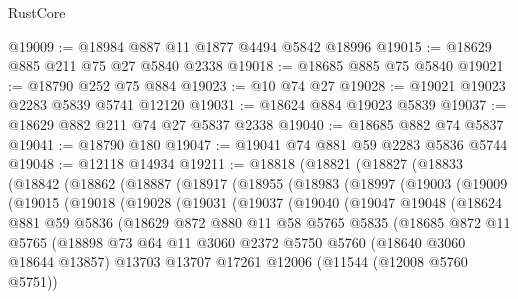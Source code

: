\begin{lexlean}{RustCore}
\begin{coremodule}
@19009 := @18984 @887 @11 @1877 @4494 @5842 @18996
@19015 := @18629 @885 @211 @75 @27 @5840 @2338
@19018 := @18685 @885 @75 @5840
@19021 := @18790 @252 @75 @884
@19023 := @10 @74 @27
@19028 := @19021 @19023 @2283 @5839 @5741 @12120
@19031 := @18624 @884 @19023 @5839
@19037 := @18629 @882 @211 @74 @27 @5837 @2338
@19040 := @18685 @882 @74 @5837
@19041 := @18790 @180
@19047 := @19041 @74 @881 @59 @2283 @5836 @5744
@19048 := @12118 @14934
@19211 := @18818
    (@18821
      (@18827
        (@18833
          (@18842
            (@18862
              (@18887
                (@18917
                  (@18955
                    (@18983
                      (@18997
                        (@19003
                          (@19009
                            (@19015
                              (@19018
                                (@19028
                                  (@19031
                                    (@19037
                                      (@19040
                                        (@19047
                                          @19048
                                          (@18624
                                            @881
                                            @59
                                            @5836
                                            (@18629
                                              @872
                                              @880
                                              @11
                                              @58
                                              @5765
                                              @5835
                                              (@18685
                                                @872
                                                @11
                                                @5765
                                                (@18898
                                                  @73
                                                  @64
                                                  @11
                                                  @3060
                                                  @2372
                                                  @5750
                                                  @5760
                                                  (@18640 @3060 @18644 @13857)
                                                  @13703
                                                  @13707
                                                  @17261
                                                  @12006
                                                  (@11544 (@12008 @5760 @5751))

\end{coremodule}
\end{lexlean}
